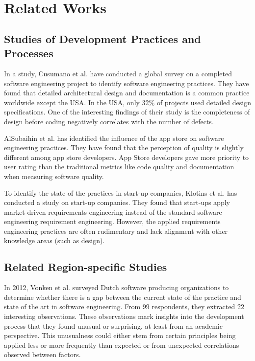 \section{Related Works}
\label{related_works}
\subsection{Studies of Development Practices and Processes}
\label{dev practice study}
In a study, Cusumano et al.\cite{Cusumano2003} have conducted a global survey on a completed software engineering project to identify software engineering practices. They have found that detailed architectural design and documentation is a common practice worldwide except the USA. In the USA, only 32\% of projects used detailed design specifications. One of the interesting findings of their study is the completeness of design before coding negatively correlates with the number of defects.

AlSubaihin et al.\cite{AlSubaihin2019} has identified the influence of the app store on software engineering practices. They have found that the perception of quality is slightly different among app store developers. App Store developers gave more priority to user rating than the traditional metrics like code quality and documentation when measuring software quality.

To identify the state of the practices in start-up companies, Klotins et al.\cite{Klotins2018} has conducted a study on start-up companies. They found that start-ups apply market-driven requirements engineering instead of the standard software engineering requirement engineering. However,  the applied requirements engineering practices are often rudimentary and lack alignment with other knowledge areas (such as design).

\subsection{Related Region-specific Studies}
\label{region specific study}

In 2012, Vonken et al.\cite{Vonken2012} surveyed Dutch software producing organizations to determine whether there is a gap between the current state of the practice and state of the art in software engineering. From 99 respondents, they extracted 22 interesting observations. These observations mark insights into the development process that they found unusual or surprising, at least from an academic perspective. This unusualness could either stem from certain principles being applied less or more frequently than expected or from unexpected correlations observed between factors.

